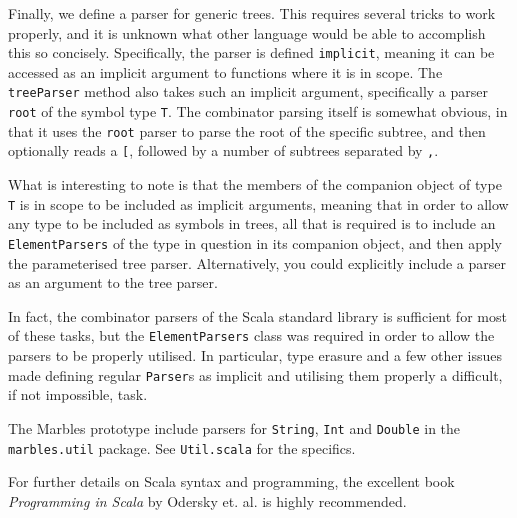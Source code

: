 Finally, we define a parser for generic trees. This requires several tricks
to work properly, and it is unknown what other language would be able to
accomplish this so concisely. Specifically, the parser is defined
\texttt{implicit}, meaning it can be accessed as an implicit argument to
functions where it is in scope. The \texttt{treeParser} method also takes
such an implicit argument, specifically a parser \texttt{root} of the
symbol type \texttt{T}. The combinator parsing itself is somewhat obvious,
in that it uses the \texttt{root} parser to parse the root of the specific
subtree, and then optionally reads a \texttt{[}, followed by a number of
subtrees separated by \texttt{,}.

What is interesting to note is that the members of the companion object of
type \texttt{T} is in scope to be included as implicit arguments, meaning
that in order to allow any type to be included as symbols in trees, all
that is required is to include an \texttt{ElementParsers} of the type in
question in its companion object, and then apply the parameterised tree
parser. Alternatively, you could explicitly include a parser as an argument
to the tree parser. %

In fact, the combinator parsers of the Scala standard library is sufficient
for most of these tasks, but the \texttt{ElementParsers} class was required
in order to allow the parsers to be properly utilised. In particular, type
erasure and a few other issues made defining regular \texttt{Parser}s as
implicit and utilising them properly a difficult, if not impossible, task.  

The Marbles prototype include parsers for \texttt{String}, \texttt{Int} and
\texttt{Double} in the \texttt{marbles.util} package. See
\texttt{Util.scala} for the specifics.

For further details on Scala syntax and programming, the excellent book
\textit{Programming in Scala} by Odersky et. al. is highly recommended. 


